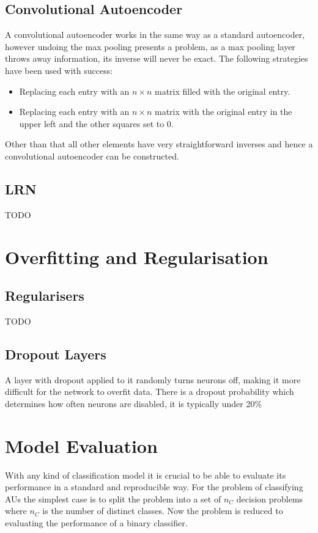     \subsection{Convolutional Autoencoder}
      A convolutional autoencoder works in the same way as a standard autoencoder, however
      undoing the max pooling presents a problem, as a max pooling layer throws away
      information, its inverse will never be exact. The following strategies have been
      used with success:
      \begin{itemize}
        \item Replacing each entry with an $n \times n$ matrix filled with the original
        entry.
        \item Replacing each entry with an  $n\times n$  matrix with
        the original entry in the upper left and the other squares set to 0. \cite{Dosovitskiy2015}
      \end{itemize}

      Other than that all other elements have very straightforward inverses and hence
      a convolutional autoencoder can be constructed.
    \subsection{LRN}
      TODO
  \section{Overfitting and Regularisation}
    \subsection{Regularisers}
      TODO
    \subsection{Dropout Layers} \label{sec:dropout}
      A layer with dropout applied to it randomly turns neurons off, making it more
      difficult for the network to overfit data. There is a dropout probability
      which determines how often neurons are disabled, it is typically under 20\%
  \section{Model Evaluation} \label{sec:eval}
    With any kind of classification model it is crucial to be able to evaluate its
    performance in a standard and reproducible way. For the problem of classifying
    AUs the simplest case is to split the problem into a set of $n_C$ decision problems
    where $n_C$ is the number of distinct classes. Now the problem is reduced to
    evaluating the performance of a binary classifier.

